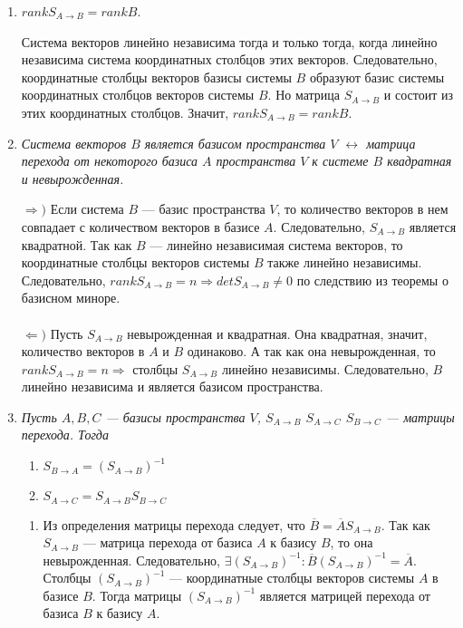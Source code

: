 \begin{enumerate}
	\item $rankS_{A\rightarrow B} = rankB$.
	\begin{Proof}
		Система векторов линейно независима тогда и только тогда, когда линейно независима система координатных столбцов этих векторов. Следовательно, координатные столбцы векторов базисы системы $B$ образуют базис системы координатных столбцов векторов системы $B$. Но матрица $S_{A\rightarrow B}$ и состоит из этих координатных столбцов. Значит, $rankS_{A\rightarrow B} = rankB$.
	\end{Proof}
	\item \textit{Система векторов $B$ является базисом пространства $V$ $\longleftrightarrow$ матрица перехода от некоторого базиса $A$ пространства $V$ к системе $B$ квадратная и невырожденная.}\begin{Proof}
		$\Rightarrow)$ Если система $B$ --- базис пространства $V$, то количество векторов в нем совпадает с количеством векторов в базисе $A$. Следовательно, $S_{A\rightarrow B}$ является квадратной. Так как $B$ --- линейно независимая система векторов, то координатные столбцы векторов системы $B$ также линейно независимы. Следовательно, $rankS_{A\rightarrow B} = n\Rightarrow detS_{A\rightarrow B}\ne 0$ по следствию из теоремы о базисном миноре.\\\\
		$\Leftarrow)$ Пусть $S_{A\rightarrow B}$ невырожденная и квадратная. Она квадратная, значит, количество векторов в $A$ и $B$ одинаково. А так как она невырожденная, то $rankS_{A\rightarrow B} = n\Rightarrow$ столбцы $S_{A\rightarrow B}$ линейно независимы. Следовательно, $B$ линейно независима и является базисом пространства.
	\end{Proof}
	\item \textit{Пусть $A,B,C$ --- базисы пространства $V$, $S_{A\rightarrow B}$ $S_{A\rightarrow C}$ $S_{B\rightarrow C}$ --- матрицы перехода. Тогда}\begin{enumerate}
		\item $S_{B\rightarrow A} = (S_{A\rightarrow B})^{-1}$
		\item $S_{A\rightarrow C} = S_{A\rightarrow B}S_{B\rightarrow C}$
	\end{enumerate}
	\begin{Proof}
		\begin{enumerate}
			\item Из определения матрицы перехода следует, что $\overline{B} = \overline{A}S_{A\rightarrow B}$. Так как $S_{A\rightarrow B}$ --- матрица перехода от базиса $A$ к базису $B$, то она невырожденная. Следовательно, $\exists (S_{A\rightarrow B})^{-1}:\overline{B}(S_{A\rightarrow B})^{-1} = \overline{A}$. Столбцы $(S_{A\rightarrow B})^{-1}$ --- координатные столбцы векторов системы $A$ в базисе $B$. Тогда матрицы $(S_{A\rightarrow B})^{-1}$ является матрицей перехода от базиса $B$ к базису $A$.

\end{enumerate}
\end{Proof}
\end{enumerate}
